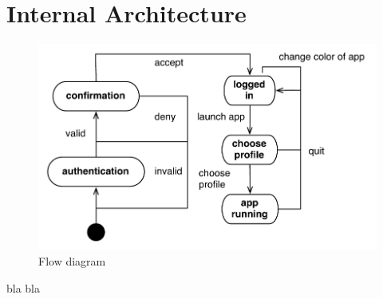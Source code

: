\section{Internal Architecture}



\begin{figure}[h!]
	\centering
	\includegraphics[width=1\textwidth]{gfx/flow-diagram.pdf}
	\caption{Flow diagram}
	\label{fig:flow_diagram}
\end{figure}

bla bla